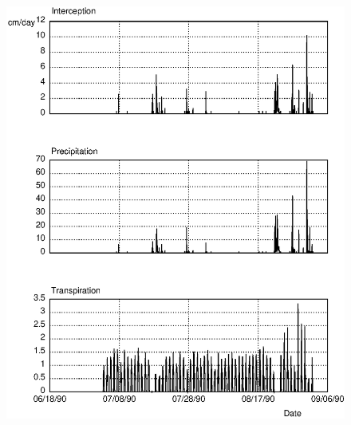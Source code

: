 \begin{figure}
\centerline{
\includegraphics{psfig/watbal1.eps}
}
\label{fig:watbal1}
\caption{}
\end{figure}


